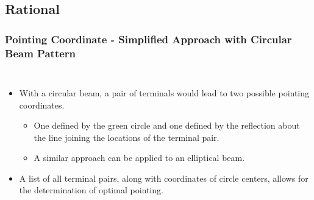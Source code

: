 \documentclass[aspectratio=169]{beamer}
\begin{document}
\subsection{Rational}
\begin{frame}
\frametitle{Pointing Coordinate - Simplified Approach with Circular Beam Pattern}
\begin{columns}

\begin{itemize}
\item With a circular beam, a pair of terminals would lead to two possible pointing coordinates.
\begin{itemize}
	\item One defined by the green circle and one defined by the reflection about the line joining the locations of the terminal pair.
	\item A similar approach can be applied to an elliptical beam.
\end{itemize}
\item A list of all terminal pairs, along with coordinates of circle centers, allows for the determination of optimal pointing.
\end{itemize}
\end{columns}

\end{frame}
\end{document}
